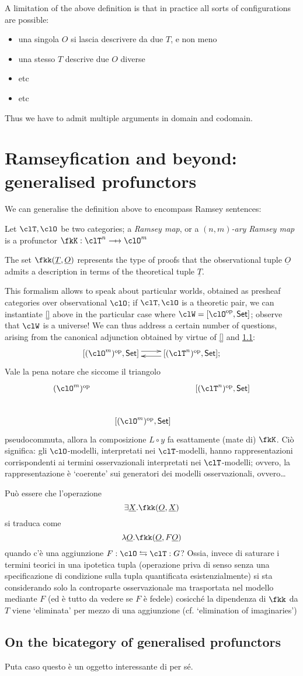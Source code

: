 \documentclass[a4paper]{../birkjour}
\begin{document}
A limitation of the above definition is that in practice all sorts of configurations are possible:
\begin{itemize}
  \item una singola $O$ si lascia descrivere da due $T$, e non meno
  \item una stesso $T$ descrive due $O$ diverse
  \item etc
  \item etc
\end{itemize}
Thus we have to admit multiple arguments in domain and codomain.
\section{Ramseyfication and beyond: generalised profunctors}
\label{sec:org50db6c2}
We can generalise the definition above to encompass Ramsey sentences:
\begin{definition}
  Let $\clT,\clO$ be two categories; a \emph{Ramsey map}, or a \emph{$(n,m)$-ary Ramsey map} is a profunctor $\fkK : \clT^n \pto \clO^m$
\end{definition}
The set $\fkk(\underline T, \underline O)$ represents the type of proofs that the observational tuple $\underline O$ admits a description in terms of the theoretical tuple $\underline T$.

This formalism allows to speak about particular worlds, obtained as presheaf categories over observational $\clO$; if $\clT, \clO$ is a theoretic pair, we can instantiate \autoref{} above in the particular case where $\clW = [\clO^\op, \Set]$; observe that $\clW$ is a universe! We can thus address a certain number of questions, arising from the canonical adjunction obtained by virtue of \autoref{} and \ref{}:
\[
  \xymatrix{ [(\clO^m)^\op, \Set] \ar@<3pt>[r] & \ar@<3pt>[l] [(\clT^n)^\op, \Set];}
\]
Vale la pena notare che siccome il triangolo
\[
\vcenter{\xymatrix{
  (\clO^m)^\op && [(\clT^n)^\op, \Set] \\
  & [(\clO^m)^\op, \Set]
}}
\]
pseudocommuta, allora la composizione $L\circ y$ fa esattamente (mate di) $\fkK$. Ciò significa: gli $\clO$-modelli, interpretati nei $\clT$-modelli, hanno rappresentazioni corrispondenti ai termini osservazionali interpretati nei $\clT$-modelli; ovvero, la rappresentazione è `coerente' sui generatori dei modelli osservazionali, ovvero\dots

Può essere che l'operazione 
\[\exists \underline X . \fkk(\underline O, \underline X)\]
si traduca come 
\[\lambda \underline O.\fkk(\underline O, F\underline O)\]
quando c'è una aggiunzione $F : \clO \leftrightarrows \clT : G$? Ossia, invece di saturare i termini teorici in una ipotetica tupla (operazione priva di senso senza una specificazione di condizione sulla tupla quantificata esistenzialmente) si sta considerando solo la controparte osservazionale ma trasportata nel modello mediante $F$ (ed è tutto da vedere se $F$ è fedele) cosicché la dipendenza di $\fkk$ da $T$ viene `eliminata' per mezzo di una aggiunzione (cf. `elimination of imaginaries')
\subsection{On the bicategory of generalised profunctors}
Puta caso questo è un oggetto interessante di per sé.
 
{}

\end{document}
